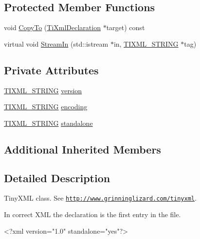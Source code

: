 \subsection*{Protected Member Functions}
\begin{DoxyCompactItemize}
\item 
void \hyperlink{class_ti_xml_declaration_a189de17b3e04d4e5b1c385336f214af1}{Copy\+To} (\hyperlink{class_ti_xml_declaration}{Ti\+Xml\+Declaration} $\ast$target) const
\item 
virtual void \hyperlink{class_ti_xml_declaration_a72e455200e6b6e265e76bdec4417bb73}{Stream\+In} (std\+::istream $\ast$in, \hyperlink{tinyxml_8h_a92bada05fd84d9a0c9a5bbe53de26887}{T\+I\+X\+M\+L\+\_\+\+S\+T\+R\+I\+NG} $\ast$tag)
\end{DoxyCompactItemize}
\subsection*{Private Attributes}
\begin{DoxyCompactItemize}
\item 
\hyperlink{tinyxml_8h_a92bada05fd84d9a0c9a5bbe53de26887}{T\+I\+X\+M\+L\+\_\+\+S\+T\+R\+I\+NG} \hyperlink{class_ti_xml_declaration_ab9eb14dc9cb78e3a8a0636d5d6a5d04d}{version}
\item 
\hyperlink{tinyxml_8h_a92bada05fd84d9a0c9a5bbe53de26887}{T\+I\+X\+M\+L\+\_\+\+S\+T\+R\+I\+NG} \hyperlink{class_ti_xml_declaration_a24b8645d7696ec169bbb3fb7d30860cf}{encoding}
\item 
\hyperlink{tinyxml_8h_a92bada05fd84d9a0c9a5bbe53de26887}{T\+I\+X\+M\+L\+\_\+\+S\+T\+R\+I\+NG} \hyperlink{class_ti_xml_declaration_a52524bf1a0726104350fe4121d7fdff4}{standalone}
\end{DoxyCompactItemize}
\subsection*{Additional Inherited Members}


\subsection{Detailed Description}
Tiny\+X\+ML class. See \href{http://www.grinninglizard.com/tinyxml}{\tt http\+://www.\+grinninglizard.\+com/tinyxml}. 

In correct X\+ML the declaration is the first entry in the file. \begin{DoxyVerb}<?xml version="1.0" standalone="yes"?>
\end{DoxyVerb}


